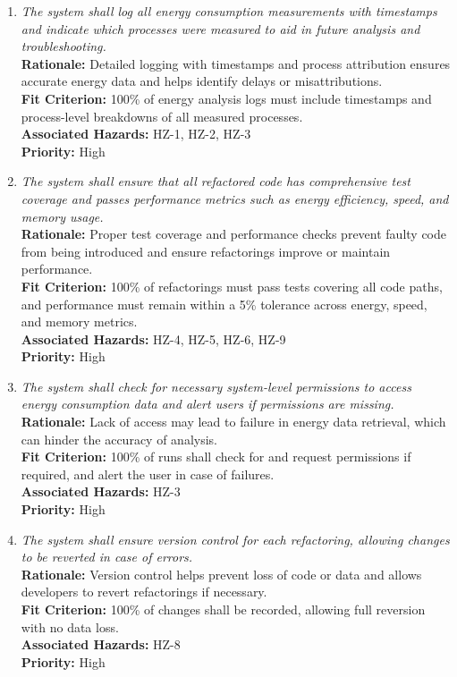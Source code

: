 \documentclass{article}
\begin{document}
\begin{enumerate}[label=SCR \arabic*., wide=0pt, leftmargin=*]

    \item \emph{The system shall log all energy consumption measurements with timestamps and indicate which processes were measured to aid in future analysis and troubleshooting.}\\
    {\bf Rationale:} Detailed logging with timestamps and process attribution ensures accurate energy data and helps identify delays or misattributions.\\
    {\bf Fit Criterion:} 100\% of energy analysis logs must include timestamps and process-level breakdowns of all measured processes.\\
    {\bf Associated Hazards:} HZ-1, HZ-2, HZ-3\\
    {\bf Priority:} High

    \item \emph{The system shall ensure that all refactored code has comprehensive test coverage and passes performance metrics such as energy efficiency, speed, and memory usage.}\\
    {\bf Rationale:} Proper test coverage and performance checks prevent faulty code from being introduced and ensure refactorings improve or maintain performance.\\
    {\bf Fit Criterion:} 100\% of refactorings must pass tests covering all code paths, and performance must remain within a 5\% tolerance across energy, speed, and memory metrics.\\
    {\bf Associated Hazards:} HZ-4, HZ-5, HZ-6, HZ-9\\
    {\bf Priority:} High

    \item \emph{The system shall check for necessary system-level permissions to access energy consumption data and alert users if permissions are missing.}\\
    {\bf Rationale:} Lack of access may lead to failure in energy data retrieval, which can hinder the accuracy of analysis.\\
    {\bf Fit Criterion:} 100\% of runs shall check for and request permissions if required, and alert the user in case of failures.\\
    {\bf Associated Hazards:} HZ-3\\
    {\bf Priority:} High

    \item \emph{The system shall ensure version control for each refactoring, allowing changes to be reverted in case of errors.}\\
    {\bf Rationale:} Version control helps prevent loss of code or data and allows developers to revert refactorings if necessary.\\
    {\bf Fit Criterion:} 100\% of changes shall be recorded, allowing full reversion with no data loss.\\
    {\bf Associated Hazards:} HZ-8\\
    {\bf Priority:} High


\end{enumerate}
\end{document}
